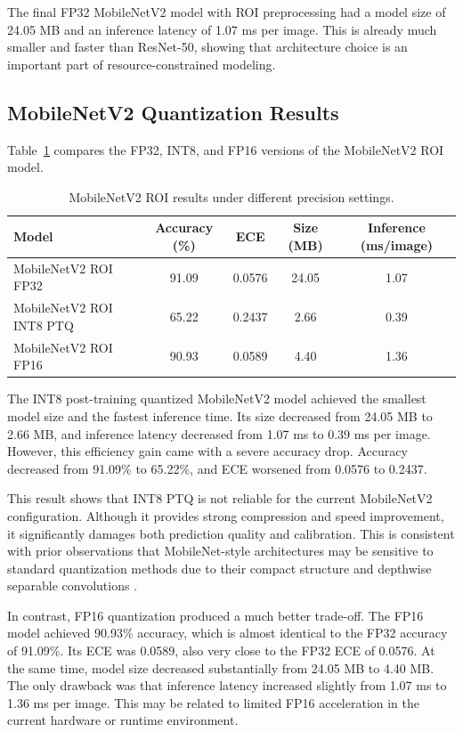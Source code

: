 \documentclass{article} %
\begin{document}
The final FP32 MobileNetV2 model with ROI preprocessing had a model size of 24.05 MB and an inference latency of 1.07 ms per image. This is already much smaller and faster than ResNet-50, showing that architecture choice is an important part of resource-constrained modeling.

\subsection{MobileNetV2 Quantization Results}

Table~\ref{tab:mobile_quant} compares the FP32, INT8, and FP16 versions of the MobileNetV2 ROI model.

\begin{table}[t]
\centering
\caption{MobileNetV2 ROI results under different precision settings.}
\label{tab:mobile_quant}
\begin{tabular}{lcccc}
\toprule
Model & Accuracy (\%) & ECE & Size (MB) & Inference (ms/image) \\
\midrule
MobileNetV2 ROI FP32 & 91.09 & 0.0576 & 24.05 & 1.07 \\
MobileNetV2 ROI INT8 PTQ & 65.22 & 0.2437 & 2.66 & 0.39 \\
MobileNetV2 ROI FP16 & 90.93 & 0.0589 & 4.40 & 1.36 \\
\bottomrule
\end{tabular}
\end{table}

The INT8 post-training quantized MobileNetV2 model achieved the smallest model size and the fastest inference time. Its size decreased from 24.05 MB to 2.66 MB, and inference latency decreased from 1.07 ms to 0.39 ms per image. However, this efficiency gain came with a severe accuracy drop. Accuracy decreased from 91.09\% to 65.22\%, and ECE worsened from 0.0576 to 0.2437.

This result shows that INT8 PTQ is not reliable for the current MobileNetV2 configuration. Although it provides strong compression and speed improvement, it significantly damages both prediction quality and calibration. This is consistent with prior observations that MobileNet-style architectures may be sensitive to standard quantization methods due to their compact structure and depthwise separable convolutions \citep{kulkarni2021qfmobile,dinh2020subtensor}.

In contrast, FP16 quantization produced a much better trade-off. The FP16 model achieved 90.93\% accuracy, which is almost identical to the FP32 accuracy of 91.09\%. Its ECE was 0.0589, also very close to the FP32 ECE of 0.0576. At the same time, model size decreased substantially from 24.05 MB to 4.40 MB. The only drawback was that inference latency increased slightly from 1.07 ms to 1.36 ms per image. This may be related to limited FP16 acceleration in the current hardware or runtime environment.
\end{document}
